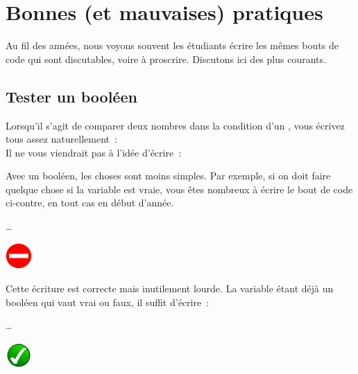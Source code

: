 \chapter{Bonnes (et mauvaises) pratiques}

	Au fil des années,
	nous voyons souvent les étudiants écrire
	les mêmes bouts de code qui sont discutables,
	voire à proscrire.
	Discutons ici des plus courants.
	
\section{Tester un booléen}

	Lorsqu’il s’agit de comparer deux nombres dans la condition
	d’un , vous écrivez tous assez naturellement~:
	\\Il ne vous viendrait pas à l’idée d’écrire~:
	
	\bigskip
	\begin{minipage}{9cm}
		Avec un booléen, les choses sont moins simples.
		Par exemple, si on doit faire quelque chose
		si la variable  est vraie,
		vous êtes nombreux à écrire
		le bout de code ci-contre,
		en tout cas en début d’année.
	\end{minipage}
	\quad
	\begin{minipage}{4cm}
		\begin{LDA}
			\Stmt \dots
		\EndIf
		\end{LDA}
	\end{minipage}
	\hskip-5mm
	\includegraphics[width=1cm]{icon/dont}
	
	\bigskip
	\begin{minipage}{9cm}
		Cette écriture est correcte mais inutilement lourde.
		La variable étant déjà un booléen qui vaut vrai ou faux,
		il suffit d’écrire~:
	\end{minipage}
	\quad
	\begin{minipage}{4cm}
		\begin{LDA}
		\If{adulte}
			\Stmt \dots
		\EndIf
		\end{LDA}
	\end{minipage}
	\hskip-5mm
	\includegraphics[width=1cm]{icon/do}
	
